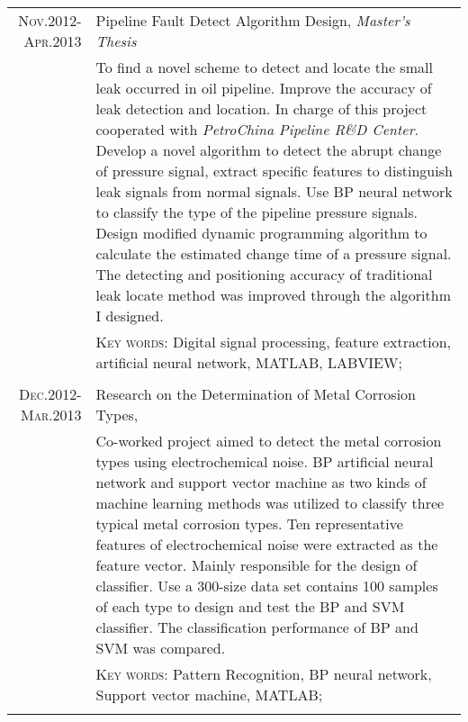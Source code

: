 \documentclass[a4paper,10pt]{article} %
\begin{document}
\begin{tabular}{r|p{11cm}}
\textsc{Nov.2012-Apr.2013} & Pipeline Fault Detect Algorithm Design, \emph{ Master's Thesis}\\
& \footnotesize{To find a novel scheme to detect and locate the small leak occurred in oil pipeline. Improve the accuracy of leak detection and location. In charge of this project cooperated with \emph{PetroChina Pipeline R\&D Center}. Develop a novel algorithm to detect the abrupt change of pressure signal, extract specific features to distinguish leak signals from normal signals. Use BP neural network to classify the type of the pipeline pressure signals. Design modified dynamic programming algorithm to calculate the estimated change time of a pressure signal. The detecting and positioning accuracy of traditional leak locate method was improved through the algorithm I designed.}\\
& \footnotesize{\textsc{Key words:} Digital signal processing, feature extraction, artificial neural network, MATLAB, LABVIEW;}\\
\multicolumn{2}{c}{} \\

\textsc{Dec.2012-Mar.2013} & Research on the Determination of Metal Corrosion Types, \emph{}\\
& \footnotesize{Co-worked project aimed to detect the metal corrosion types using electrochemical noise. BP artificial neural network and support vector machine as two kinds of machine learning methods was utilized to classify three typical metal corrosion types. Ten representative features of electrochemical noise were extracted as the feature vector. Mainly responsible for the design of classifier. Use a 300-size data set contains 100 samples of each type to design and test the BP and SVM classifier. The classification performance of BP and SVM was compared.}\\
& \footnotesize{\textsc{Key words:} Pattern Recognition, BP neural network, Support vector machine, MATLAB;}\\
\multicolumn{2}{c}{} \\


\end{tabular}
\end{document}
